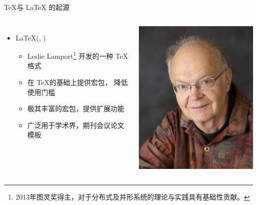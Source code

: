 \begin{frame}[fragile]{\TeX 与 \LaTeX{} 的起源}
\begin{columns}[T]
\begin{itemize}
        \vspace{2em}
      \item \LaTeX{}(, )
        \begin{itemize}
          \item Leslie Lamport\footnote{2013年图灵奖得主，对于分布式及并形系统的理论与实践具有基础性贡献。} 开发的一种 \TeX 格式
          \item 在 \TeX 的基础上提供宏包， 降低使用门槛
          \item 极其丰富的宏包，提供扩展功能
          \item 广泛用于学术界，期刊会议论文模板
        \end{itemize}
    \end{itemize}
    \vspace*{-5mm}
    \hspace{-10mm} \includegraphics[width=\textwidth]{images/Knuth.jpg}


\end{columns}
\end{frame}
